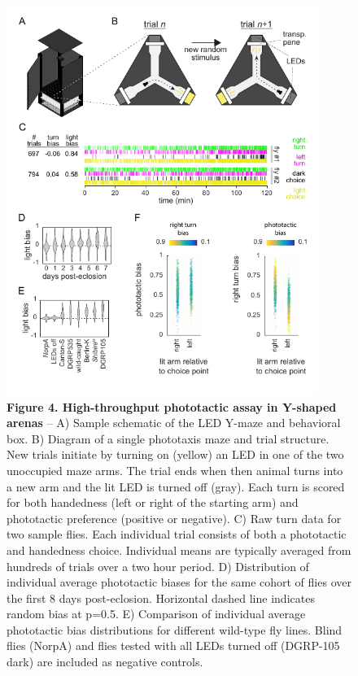 \documentclass[10pt]{article}
\begin{document}
\newpage
\begin{figure}[h!]
	\begin{center}
		\includegraphics[width=0.9\textwidth]{../figures/LED_ymaze_panel.pdf}
	\end{center}
	\caption*{\footnotesize \textbf{Figure 4. High-throughput phototactic assay in Y-shaped arenas} -- A) Sample schematic of the LED Y-maze and behavioral box. B) Diagram of a single phototaxis maze and trial structure. New trials initiate by turning on (yellow) an LED in one of the two unoccupied maze arms. The trial ends when then animal turns into a new arm and the lit LED is turned off (gray). Each turn is scored for both handedness (left or right of the starting arm) and phototactic preference (positive or negative). C) Raw turn data for two sample flies. Each individual trial consists of both a phototactic and handedness choice. Individual means are typically averaged from hundreds of trials over a two hour period. D) Distribution of individual average phototactic biases for the same cohort of flies over the first 8 days post-eclosion. Horizontal dashed line indicates random bias at p=0.5. E) Comparison of individual average phototactic bias distributions for different wild-type fly lines. Blind flies (NorpA) and flies tested with all LEDs turned off (DGRP-105 dark) are included as negative controls.}
\end{figure}
\end{document}
